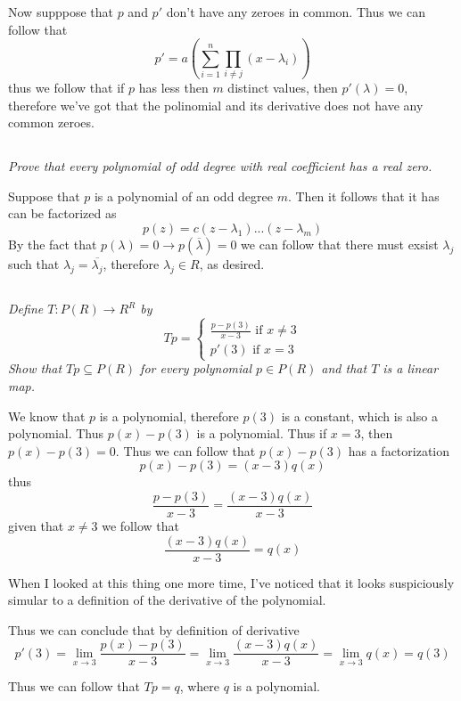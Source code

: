 \documentclass[11pt,oneside,titlepage]{book}
\begin{document}
Now supppose that $p$ and $p'$ don't have any zeroes in common. Thus we can follow that 
$$p' = a (\sum_{i = 1}^{n}{\prod_{i \neq j}{(x - \lambda_i)}})$$
thus we follow that if $p$ has less then $m$ distinct values, then $p'(\lambda) = 0$, therefore
we've got that the polinomial and its derivative does not have any common zeroes.

\subsection{}

\textit{Prove that every polynomial of odd degree with real coefficient has a real zero.}

Suppose that $p$ is a polynomial of an odd degree $m$. Then it follows that
it has can be factorized as
$$p(z) = c (z - \lambda_1) ... (z - \lambda_m)$$
By the fact that $p(\lambda ) = 0 \to p(\overline{\lambda} ) = 0$ we can follow that there must
exsist $\lambda_j$ such that $\lambda_j = \overline{\lambda_j}$, therefore $\lambda_j \in R$, as
desired.


\subsection{}

\textit{Define $T: P(R) \to R^R$ by}
$$Tp =
\begin{cases}
  \frac{p - p(3)}{x - 3} \text{ if } x \neq 3 \\
  p'(3) \text{ if } x = 3
\end{cases}
$$
\textit{Show that $Tp \subseteq P(R)$ for every polynomial $p \in P(R)$ and that $T$ is a
  linear map.}

We know that $p$ is a polynomial, therefore $p(3)$ is a constant, which is also a polynomial.
Thus $p(x) - p(3)$ is a polynomial. Thus if $x = 3$, then $p(x) - p(3) = 0$. Thus we can follow
that $p(x) - p(3)$ has a factorization
$$p(x) - p(3) = (x - 3)q(x)$$
thus
$$  \frac{p - p(3)}{x - 3} = \frac{(x - 3)q(x)}{x - 3}$$
given that $x \neq 3$ we follow that
$$\frac{(x - 3)q(x)}{x - 3} = q(x)$$

When I looked at this thing one more time, I've noticed that it looks suspiciously
simular to a definition of the derivative of the polynomial.

Thus we can conclude that by definition of derivative 
$$p'(3) = \lim_{x \to 3}{\frac{p(x) - p(3)}{x - 3}} = \lim_{x \to 3}{\frac{(x - 3)q(x)}{x - 3}} =
\lim_{x \to 3}{q(x)} = q(3)$$

Thus we can follow that $Tp = q$, where $q$ is a polynomial.
\end{document}
